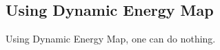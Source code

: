 \documentclass[hidelinks,12pt]{article}
\begin{document}
\subsection{Using Dynamic Energy Map}
Using Dynamic Energy Map, one can do nothing.

\begin{comment}
\item Conclusion
  \begin{enumerate}[label*=\arabic*.]
  \item Summary of the current approach in implementing the dynamic
    Energy Map
  \item Limitations of the current implementation
    \begin{enumerate}[label*=\arabic*.]
    \item Simplified building simulation assumption about urban
      environment
    \item Lack of user choices for the stand-alone user interface as a
      result of its dependence on existing modeling softwares
    \end{enumerate}
  \item Future Expansion of the project
    \begin{enumerate}[label*=\arabic*.]
    \item Adding information of the supply side: residual energy,
      sustainable energy
    \item Providing different interfaces for different user population
    \item 2D and 3D compatible \\The reason for providing 2D map
      together with 3D map is that 2D maps have the following good
      properties:
      \begin{enumerate}[label*=\arabic*.]
      \item Better for region selection and spatial navigation than 3D
        map
      \item Better for conveying spatial relationship that does not
        involve height induced variation
      \item For larger scale display of city, state or nationwide, 3D
        building geometries becomes less significant in providing the
        urban environment context
      \end{enumerate}
    \item Creating an on-line tool for better information share
      \begin{enumerate}[label*=\arabic*.]
      \item Potential techniques: see 2.4
      \end{enumerate}
    \end{enumerate}
  \end{enumerate}
\item Acknowledgments
\end{enumerate}
\end{comment}
\newpage


\end{document}
